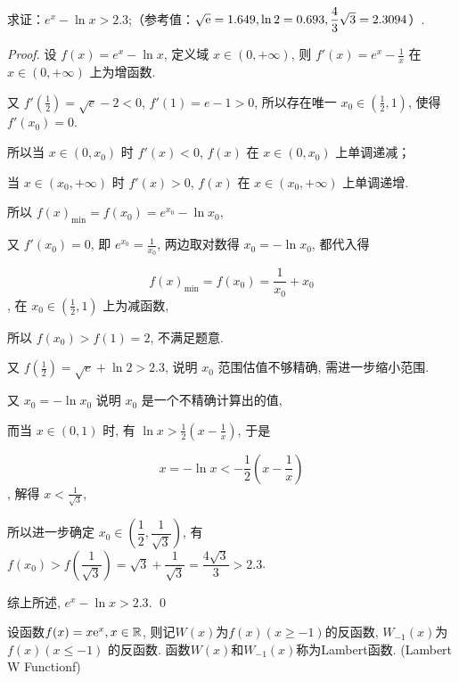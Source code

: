 \begin{example}
    求证：\(e^x-\ln x >2.3\);（参考值：\(\sqrt{\mathrm{e}}=1.649,\ln 2=0.693,\dfrac{4}{3}\sqrt{3}=2.3094\)）.
\end{example}

\begin{proof}
    设 $f(x) = e^x - \ln x$, 定义域 $x \in (0, +\infty)$, 则 $f'(x) = e^x - \frac{1}{x}$ 在 $x \in (0, +\infty)$ 上为增函数. 

又 $f'\left(\frac{1}{2}\right) = \sqrt{e} - 2 < 0$, $f'(1) = e - 1 > 0$, 所以存在唯一 $x_0 \in \left(\frac{1}{2}, 1\right)$, 使得 $f'(x_0) = 0$. 

所以当 $x \in (0, x_0)$ 时 $f'(x) < 0$, $f(x)$ 在 $x \in (0, x_0)$ 上单调递减；

当 $x \in (x_0, +\infty)$ 时 $f'(x) > 0$, $f(x)$ 在 $x \in (x_0, +\infty)$ 上单调递增. 

所以 $f(x)_{\min} = f(x_0) = e^{x_0} - \ln x_0$, 

又 $f'(x_0) = 0$, 即 $e^{x_0} = \frac{1}{x_0}$, 两边取对数得 $x_0 = -\ln x_0$, 都代入得

\[ f(x)_{\min} = f(x_0) = \frac{1}{x_0} + x_0 \], 在 $x_0 \in \left(\frac{1}{2}, 1\right)$ 上为减函数, 

所以 $f(x_0) > f(1) = 2$, 不满足题意. 

又 $f\left(\frac{1}{2}\right) = \sqrt{e} + \ln 2 > 2.3$, 说明 $x_0$ 范围估值不够精确, 需进一步缩小范围. 

又 $x_0 = -\ln x_0$ 说明 $x_0$ 是一个不精确计算出的值, 

而当 $x \in (0, 1)$ 时, 有 $\ln x > \frac{1}{2}(x - \frac{1}{x})$, 于是

\[ x = -\ln x < -\frac{1}{2}(x - \frac{1}{x}) \], 解得 $x < \frac{1}{\sqrt{3}}$, 

所以进一步确定 $x_0 \in \left(\dfrac{1}{2}, \dfrac{1}{\sqrt{3}}\right)$, 有 $f(x_0) > f\left(\dfrac{1}{\sqrt{3}}\right) = \sqrt{3} + \dfrac{1}{\sqrt{3}} = \dfrac{4\sqrt{3}}{3} > 2.3$. 

综上所述, $e^x - \ln x > 2.3$. 
\qed
\end{proof}

\begin{definition}
    设函数\(f(x)=x\mathrm{e} ^x,x\in\mathbb{R}\), 则记\(W(x)\)为\(f(x)(x\geq -1)\)的反函数, \(W_{-1}(x)\)为\(f(x)(x\leq -1)\)
    的反函数. 函数\(W(x)\)和\(W_{-1}(x)\)称为Lambert函数. (Lambert W Functionf)
\end{definition}




